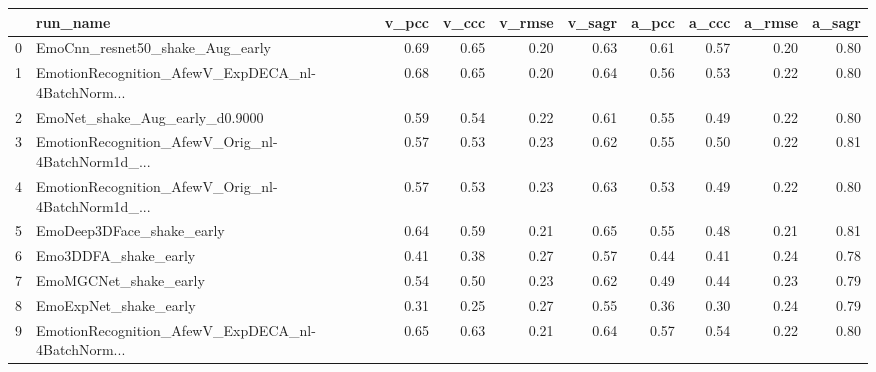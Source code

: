 \begin{tabular}{llrrrrrrrr}
\toprule
{} &                                           run\_name &  v\_pcc &  v\_ccc &  v\_rmse &  v\_sagr &  a\_pcc &  a\_ccc &  a\_rmse &  a\_sagr \\
\midrule
0 &                    EmoCnn\_resnet50\_shake\_Aug\_early &   0.69 &   0.65 &    0.20 &    0.63 &   0.61 &   0.57 &    0.20 &    0.80 \\
1 &  EmotionRecognition\_AfewV\_ExpDECA\_nl-4BatchNorm... &   0.68 &   0.65 &    0.20 &    0.64 &   0.56 &   0.53 &    0.22 &    0.80 \\
2 &                     EmoNet\_shake\_Aug\_early\_d0.9000 &   0.59 &   0.54 &    0.22 &    0.61 &   0.55 &   0.49 &    0.22 &    0.80 \\
3 &  EmotionRecognition\_AfewV\_Orig\_nl-4BatchNorm1d\_... &   0.57 &   0.53 &    0.23 &    0.62 &   0.55 &   0.50 &    0.22 &    0.81 \\
4 &  EmotionRecognition\_AfewV\_Orig\_nl-4BatchNorm1d\_... &   0.57 &   0.53 &    0.23 &    0.63 &   0.53 &   0.49 &    0.22 &    0.80 \\
5 &                          EmoDeep3DFace\_shake\_early &   0.64 &   0.59 &    0.21 &    0.65 &   0.55 &   0.48 &    0.21 &    0.81 \\
6 &                               Emo3DDFA\_shake\_early &   0.41 &   0.38 &    0.27 &    0.57 &   0.44 &   0.41 &    0.24 &    0.78 \\
7 &                              EmoMGCNet\_shake\_early &   0.54 &   0.50 &    0.23 &    0.62 &   0.49 &   0.44 &    0.23 &    0.79 \\
8 &                              EmoExpNet\_shake\_early &   0.31 &   0.25 &    0.27 &    0.55 &   0.36 &   0.30 &    0.24 &    0.79 \\
9 &  EmotionRecognition\_AfewV\_ExpDECA\_nl-4BatchNorm... &   0.65 &   0.63 &    0.21 &    0.64 &   0.57 &   0.54 &    0.22 &    0.80 \\
\bottomrule
\end{tabular}

